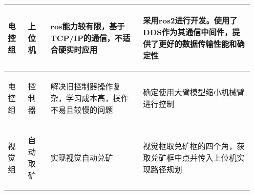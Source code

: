 \begin{longtable}{ p{1.5cm} | p{3cm} | p{6cm} | p{4.3cm} |}
    \hline

       \begin{center}
           电控组
       \end{center} &
       \begin{center}
           上位机
       \end{center} &
       \begin{center}
           ros能力较有限，基于TCP/IP的通信，不适合硬实时应用
       \end{center} &
       \begin{center}
           采用ros2进行开发。使用了DDS作为其通信中间件，提供了更好的数据传输性能和确定性
       \end{center} \\
        
    \hline
    
        \begin{center}
            电控组
        \end{center}&
        \begin{center}
            控制器
        \end{center}&
        \begin{center}
            解决旧控制器操作复杂，学习成本高，操作不易且较慢的问题
        \end{center}&
        \begin{center}
            确定使用大臂模型缩小机械臂进行控制
        \end{center}\\

    \hline
    

       \begin{center}
           视觉组
       \end{center} &
       \begin{center}
           自动取矿
       \end{center} &
       \begin{center}
           实现视觉自动兑矿
       \end{center} &
       \begin{center}
           视觉框取兑矿框的四个角，获取兑矿框中点并传入上位机实现路径规划
       \end{center} \\

    \hline
    
\end{longtable}
